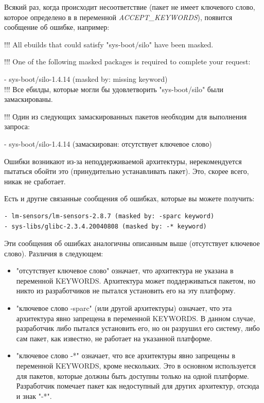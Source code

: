 \documentclass[10pt]{book}
\begin{document}
Всякий раз, когда происходит несоответствие (пакет не имеет ключевого слово, которое определено в в переменной  \textit{ACCEPT\_KEYWORDS}), появится сообщение об ошибке, например:

\begin{tcolorbox}
!!! All ebuilds that could satisfy "sys-boot/silo" have been masked.

!!! One of the following masked packages is required to complete your request:

- sys-boot/silo-1.4.14 (masked by: missing keyword) \\

!!! Все ебилды, которые могли бы удовлетворить "sys-boot/silo" были замаскированы.

!!! Один из следующих замаскированных пакетов необходим для выполнения запроса:

- sys-boot/silo-1.4.14 (замаскирован: отсутствует ключевое слово)
\end{tcolorbox}

Ошибки возникают из-за неподдерживаемой архитектуры, нерекомендуется пытаться обойти это (принудительно устанавливать пакет). Это, скорее всего, никак не сработает.

Есть и другие связанные сообщения об ошибках, которые вы можете получить:
\begin{tcolorbox}
\begin{lstlisting}
- lm-sensors/lm-sensors-2.8.7 (masked by: -sparc keyword)
- sys-libs/glibc-2.3.4.20040808 (masked by: -* keyword)
\end{lstlisting}
\end{tcolorbox}
Эти сообщения об ошибках аналогичны описанным выше (отсутствует ключевое слово). Различия в следующем:
\begin{itemize}
\item "отсутствует ключевое слово"  означает, что архитектура не указана в переменной KEYWORDS. Архитектура может поддерживаться пакетом, но никто из разработчиков не пытался установить его на эту платформу.
\item "ключевое слово -sparc" (или другой архитектуры)  означает, что эта архитектура явно запрещена в переменной KEYWORDS.
В данном случае, разработчик либо пытался установить его, но он разрушил его систему, либо сам пакет, как известно, не работает на указанной платформе.
\item "ключевое слово -*" означает, что все архитектуры явно запрещены в переменной KEYWORDS, кроме
нескольких. Это в основном используется для пакетов, которые должны быть доступны только на одной платформе. Разработчик помечает пакет как недоступный для других архитектур, отсюда и знак "-*".
\end{itemize}
\end{document}
